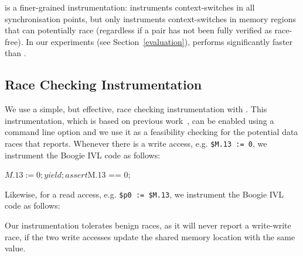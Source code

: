 \yieldmr is a finer-grained instrumentation: \whoop instruments context-switches in all synchronisation points, but only instruments context-switches in memory regions that can potentially race (regardless if a pair has not been fully verified as race-free). In our experiments (see Section~\ref{evaluation}), \yieldmr performs significantly faster than \yieldcoarse.

\subsection{Race Checking Instrumentation}
\label{bf:racechecking}

We use a simple, but effective, race checking instrumentation with \corral. This instrumentation, which is based on previous work~\cite{}, can be enabled using a command line option and we use it as a feasibility checking for the potential data races that \whoop reports. Whenever there is a write access, e.g. \texttt{\$M.13 := 0}, we instrument the Boogie IVL code as follows:

\begin{boogie}
$M.13 := 0;
yield;
assert $M.13 == 0;
\end{boogie}

Likewise, for a read access, e.g. \texttt{\$p0 := \$M.13}, we instrument the Boogie IVL code as follows:


Our instrumentation tolerates benign races, as it will never report a write-write race, if the two write accesses update the shared memory location with the same value.
